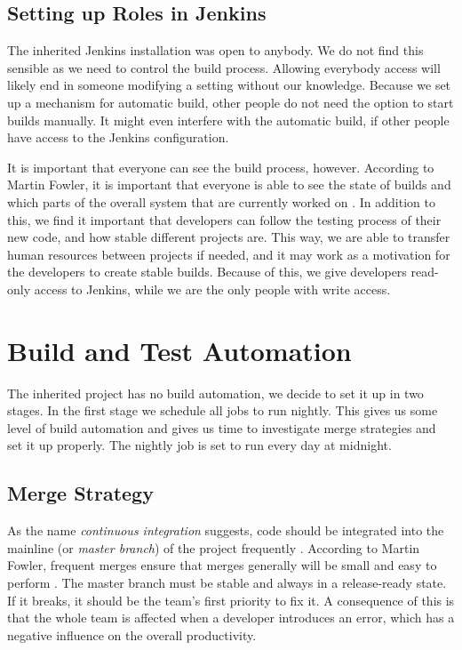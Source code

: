 \subsection{Setting up Roles in Jenkins}
The inherited Jenkins installation was open to anybody. We do not find this sensible as we need to control the build process. Allowing everybody access will likely end in someone modifying a setting without our knowledge. Because we set up a mechanism for automatic build, other people do not need the option to start builds manually. It might even interfere with the automatic build, if other people have access to the Jenkins configuration.

It is important that everyone can see the build process, however. According to Martin Fowler, it is important that everyone is able to see the state of builds and which parts of the overall system that are currently worked on \parencite{fowlerCI}. In addition to this, we find it important that developers can follow the testing process of their new code, and how stable different projects are. This way, we are able to transfer human resources between projects if needed, and it may work as a motivation for the developers to create stable builds. Because of this, we give developers read-only access to Jenkins, while we are the only people with write access.

\section{Build and Test Automation}\label{sec:build_automation}
The inherited project has no build automation, we decide to set it up in two stages. In the first stage we schedule all jobs to run nightly. This gives us some level of build automation and gives us time to investigate merge strategies and set it up properly. The nightly job is set to run every day at midnight.

\subsection{Merge Strategy}\label{sec:branching_strategy}
As the name \emph{continuous integration} suggests, code should be integrated into the mainline (or \emph{master branch}) of the project frequently \parencite{fowlerCI}. According to Martin Fowler, frequent merges ensure that merges generally will be small and easy to perform \parencite{fowlerFeatureBranch}. The master branch must be stable and always in a release-ready state. If it breaks, it should be the team's first priority to fix it. A consequence of this is that the whole team is affected when a developer introduces an error, which has a negative influence on the overall productivity.

